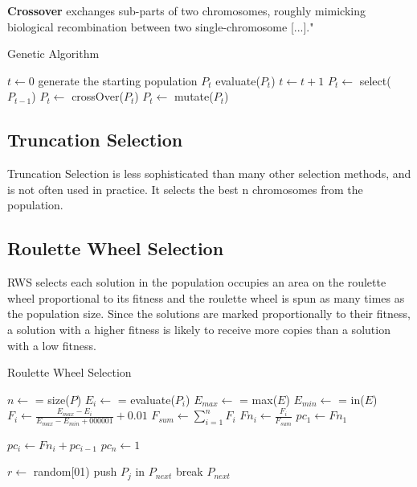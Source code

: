\documentclass{article}
\newcommand{\mSpace}{\vspace{0.3cm}}
\begin{document}
\textbf{Crossover} exchanges sub-parts of two chromosomes, roughly mimicking biological recombination between two single-chromosome [...]."\cite{mitchell1998introduction}

\begin{algorithm}
\caption{Genetic Algorithm}\label{alg:cap}
\begin{algorithmic}
\State $t \gets 0$
\State generate the starting population $P_t$
    \State evaluate($P_t$)
    \State $t \gets t + 1$
    \State $P_t \gets$ select($P_{t-1}$)
    \State $P_t \gets$ crossOver($P_t$)
    \State $P_t \gets$ mutate($P_t$)
\EndIf
\EndWhile
\end{algorithmic}
\end{algorithm}

\subsection{Truncation Selection}
Truncation Selection is less sophisticated than many other selection methods, and is not often used in practice. It selects the best n chromosomes from the population.

\subsection{Roulette Wheel Selection}
RWS selects each solution in the population occupies an area on the roulette wheel proportional to its fitness and the roulette wheel is spun as  many  times  as  the  population  size.  Since the solutions are marked proportionally to their  fitness,  a  solution  with  a  higher  fitness  is  likely  to  receive  more  copies than a solution with a low fitness.\cite{back2018evolutionary}

\begin{algorithm}
\caption{Roulette Wheel Selection}\label{alg:cap}
\begin{algorithmic}
    \State $n \gets$ = size($P$)
    \State $E_i \gets$ = evaluate($P_i$)
    \State $E_{max} \gets$ = max($E$)
    \State $E_{min} \gets$ = in($E$)
    \mSpace
    \State $F_i \gets \frac{E_{max} - E_i}{E_{max} - E_{min} + 000001} + 0.01$
    \mSpace
    \State $F_{sum} \gets \sum_{i=1}^{n}F_i$ 
    \mSpace
    \State $Fn_i \gets \frac{F_i}{F_{sum}}$
    \mSpace
    \State $pc_1 \gets Fn_1$
    
        \State $pc_i \gets Fn_i + pc_{i-1}$
    \EndFor
    \State $pc_n \gets 1$ 
    \mSpace
    
        \State $r \gets$ random[01)
                \State push $P_j$ in $P_{next}$
                \State break
            \EndIf 
        \EndFor
    \EndFor
    \State \Return $P_{next}$
\EndFunction
\end{algorithmic}
\end{algorithm}
\end{document}
